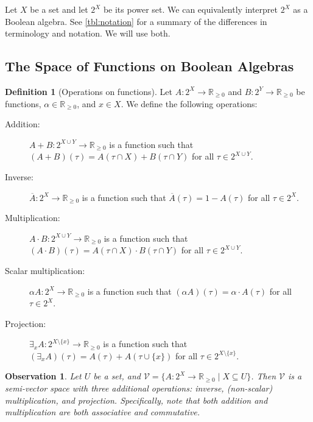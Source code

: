 \documentclass{article}
\newtheorem{observation}{Observation}
\theoremstyle{definition}
\newtheorem{definition}{Definition}
\theoremstyle{remark}
\begin{document}
Let $X$ be a set and let $2^X$ be its power set. We can equivalently interpret
$2^X$ as a Boolean algebra. See \cref{tbl:notation} for a summary of the
differences in terminology and notation. We will use both.

\subsection{The Space of Functions on Boolean Algebras}

\begin{definition}[Operations on functions]
  Let $A\colon 2^X \to \mathbb{R}_{\ge 0}$ and $B\colon 2^Y \to \mathbb{R}_{\ge
    0}$ be functions, $\alpha \in \mathbb{R}_{\ge 0}$, and $x \in X$. We define
  the following operations:
  \begin{description}
  \item[Addition:] $A+B\colon 2^{X \cup Y} \to \mathbb{R}_{\ge 0}$ is a function
    such that $(A+B)(\tau) = A(\tau \cap X) + B(\tau \cap Y)$ for all $\tau \in
    2^{X \cup Y}$.
  \item[Inverse:] $\overline{A}\colon 2^X \to \mathbb{R}_{\ge 0}$ is a function
    such that $\overline{A}(\tau) = 1 - A(\tau)$ for all $\tau \in 2^X$.
  \item[Multiplication:] $A \cdot B\colon 2^{X \cup Y} \to \mathbb{R}_{\ge 0}$
    is a function such that $(A \cdot B)(\tau) = A(\tau \cap X) \cdot B(\tau
    \cap Y)$ for all $\tau \in 2^{X \cup Y}$.
  \item[Scalar multiplication:] $\alpha A\colon 2^X \to \mathbb{R}_{\ge 0}$ is a
    function such that $(\alpha A)(\tau) = \alpha \cdot A(\tau)$ for all $\tau
    \in 2^X$.
  \item[Projection:] $\exists_xA\colon 2^{X \setminus \{ x \}} \to
    \mathbb{R}_{\ge 0}$ is a function such that $(\exists_xA)(\tau) = A(\tau) +
    A(\tau \cup \{ x \})$ for all $\tau \in 2^{X \setminus \{x \}}$.
  \end{description}
\end{definition}

\begin{observation}
  Let $U$ be a set, and $\mathcal{V} = \{ A\colon 2^X \to \mathbb{R}_{\ge 0}
  \mid X \subseteq U \}$. Then $\mathcal{V}$ is a semi-vector space with three
  additional operations: inverse, (non-scalar) multiplication, and projection.
  Specifically, note that both addition and multiplication are both associative
  and commutative.
\end{observation}
\end{document}

